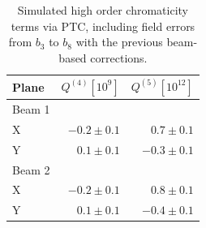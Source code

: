 \begin{table}[!htb]
    \centering
    \begin{tabular}{lrr}
    \toprule
        Plane     &  $Q^{(4)} [10^9]$  &  $Q^{(5)} [10^{12}]$ \\
    \midrule
        Beam 1    &              &               \\
        \hspace{2mm}X         & $-0.2 \pm 0.1$ & $ 0.7 \pm 0.1$ \\
        \hspace{2mm}Y         & $ 0.1 \pm 0.1$ & $-0.3 \pm 0.1$  \\
        Beam 2    &  &   \\
        \hspace{2mm}X         & $-0.2 \pm 0.1$ & $ 0.8 \pm 0.1$  \\
        \hspace{2mm}Y         & $ 0.1 \pm 0.1$ & $-0.4 \pm 0.1$ \\
    \bottomrule
    \end{tabular}
    \caption{Simulated high order chromaticity terms via PTC, including field errors from $b_3$ to $b_8$ with the previous beam-based corrections.}
    \label{ptc_values}
  \end{table}

